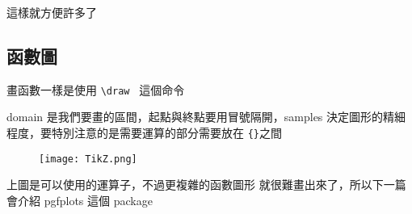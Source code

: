 這樣就方便許多了

\subsection{函數圖}

畫函數一樣是使用 \verb`\draw ` 這個命令

\begin{tcblisting}{}
\end{tcblisting}

domain 是我們要畫的區間，起點與終點要用冒號隔開，samples 決定圖形的精細程度，要特別注意的是需要運算的部分需要放在 \verb`{}`之間

\begin{figure}[htp]
\texttt{[image: TikZ.png]}
\end{figure}

上圖是可以使用的運算子，不過更複雜的函數圖形 \TikZ 就很難畫出來了，所以下一篇會介紹 pgfplots 這個 package
